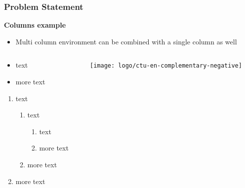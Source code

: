 \begin{frame}
   \frametitle{Problem Statement}
   \textbf{\color{ctu4blue}Columns example}
   \begin{itemize}\justifying
      \item Multi column environment can be combined with a single column as well  
   \end{itemize}
   \begin{columns}[t, onlytextwidth]
      \begin{column}[T]{0.70\textwidth}
	 \begin{itemize}\justifying
	    \item text
	    \item more text
	 \end{itemize}
    \begin{enumerate}\justifying
      \item text
      \begin{enumerate}\justifying
         \item text
         \begin{enumerate}\justifying
            \item text
            \item more text
         \end{enumerate}
         \item more text
      \end{enumerate}
      \item more text
   \end{enumerate}
      \end{column}
      \begin{column}[T]{0.28\textwidth}
	 \texttt{[image: logo/ctu-en-complementary-negative]}
      \end{column}
   \end{columns}

\end{frame}


